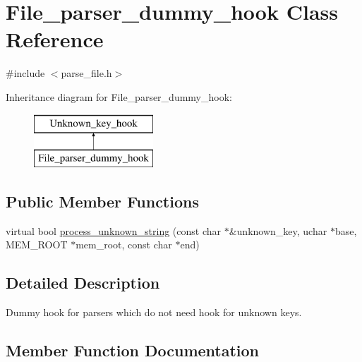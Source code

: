\hypertarget{classFile__parser__dummy__hook}{}\section{File\+\_\+parser\+\_\+dummy\+\_\+hook Class Reference}
\label{classFile__parser__dummy__hook}


{\ttfamily \#include $<$parse\+\_\+file.\+h$>$}

Inheritance diagram for File\+\_\+parser\+\_\+dummy\+\_\+hook\+:\begin{figure}[H]
\begin{center}
\leavevmode
\includegraphics[height=2.000000cm]{classFile__parser__dummy__hook}
\end{center}
\end{figure}
\subsection*{Public Member Functions}
\begin{DoxyCompactItemize}
\item 
virtual bool \mbox{\hyperlink{classFile__parser__dummy__hook_a5e8f146f4eb4663ee7b94de4e12e64d4}{process\+\_\+unknown\+\_\+string}} (const char $\ast$\&unknown\+\_\+key, uchar $\ast$base, M\+E\+M\+\_\+\+R\+O\+OT $\ast$mem\+\_\+root, const char $\ast$end)
\end{DoxyCompactItemize}


\subsection{Detailed Description}
Dummy hook for parsers which do not need hook for unknown keys. 

\subsection{Member Function Documentation}
\mbox{\label{classFile__parser__dummy__hook_a5e8f146f4eb4663ee7b94de4e12e64d4}} 
